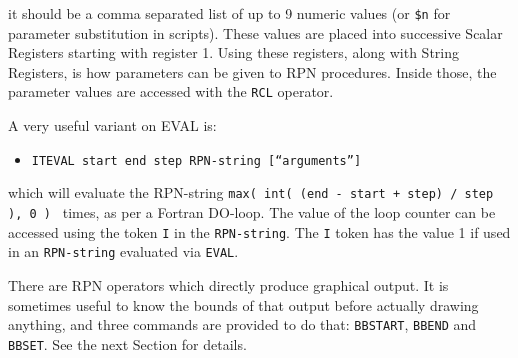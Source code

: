 \documentclass[a4paper,twoside,11pt]{article}
\newcommand{\newpara}{\par\vspace{4mm}\noindent}
\newcommand{\textttc}[1]{\texttt{\textcolor{OurRed}{#1}}}
\begin{document}
it should be a comma separated list of up to 9 numeric values (or \texttt{\$n} for parameter substitution in scripts). These
values are placed into successive Scalar Registers starting with register 1. Using these registers, along with String Registers,
is how parameters can be given to RPN procedures. Inside those, the parameter values are accessed with the \texttt{RCL} operator.
\newpara
A very useful variant on EVAL is:
\begin{itemize}
\item \textttc{ITEVAL start end step RPN-string [``arguments'']}
\end{itemize}
which will evaluate the RPN-string \texttt{max( int( (end - start + step) / step ), 0 ) } times, as per a Fortran DO-loop. The value of
the loop counter can be accessed using the token \texttt{I} in the \texttt{RPN-string}. The \texttt{I} token has the value 1 if used in an
\texttt{RPN-string} evaluated via \texttt{EVAL}.
\newpara
There are RPN operators which directly produce graphical output. It is sometimes useful to know the bounds of that output before
actually drawing anything, and three commands are provided to do that: \texttt{BBSTART}, \texttt{BBEND} and \texttt{BBSET}. See
the next Section for details.
\end{document}
